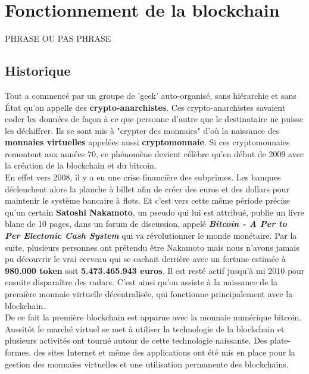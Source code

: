 \documentclass[12pt]{report}
\begin{document}
\newpage
\section{Fonctionnement de la blockchain}

\hspace{1cm}  PHRASE OU PAS PHRASE


	\subsection{Historique}
\hspace{1cm} Tout a commencé par un groupe de 'geek' auto-organisé, sans hiérarchie et sans État qu'on appelle des \textbf{crypto-anarchistes}. Ces crypto-anarchistes savaient coder les données de façon à ce que personne d'autre que le destinataire ne puisse les déchiffrer. Ils se sont mis à "crypter des monnaies" d'où la naissance des\textbf{ monnaies virtuelles} appelées aussi \textbf{cryptomonnaie}. Si ces cryptomonnaies remontent aux années 70, ce phénomène devient célèbre qu'en début de 2009 avec la création de la blockchain et du bitcoin.\\

\hspace{1cm} En effet vers 2008, il y a eu une crise financière des subprimes. Les banques déclenchent alors la planche à billet afin de créer des euros et des dollars pour maintenir le système bancaire à flots. Et c'est vers cette même période précise qu'un certain \textbf{Satoshi Nakamoto}, un pseudo qui lui est attribué, publie un livre blanc de 10 pages, dans un forum de discussion, appelé \textbf{\textit{Bitcoin - A Per to Per Electonic Cash System }} qui va révolutionner le monde monétaire. Par la suite, plusieurs personnes ont prétendu être Nakamoto mais nous n'avons jamais pu découvrir le vrai cerveau qui se cachait derrière avec un fortune estimée à \textbf{980.000 token} soit \textbf{5.473.465.943 euros}. Il est resté actif jusqu'à mi 2010 pour ensuite disparaître des radars. C'est ainsi qu'on assiste à la naissance  de la première monnaie virtuelle décentralisée, qui fonctionne principalement avec la blockchain. \\ 

\hspace{1cm} De ce fait la première blockchain est apparue avec la monnaie numérique bitcoin. Aussitôt le marché virtuel se met à utiliser la technologie de la blockchain et plusieurs activités ont tourné autour de cette technologie naissante. Des plate-formes, des sites Internet et même des applications ont été mis en place pour la gestion des monnaies virtuelles et une utilisation permanente des blockchains.
\end{document}
